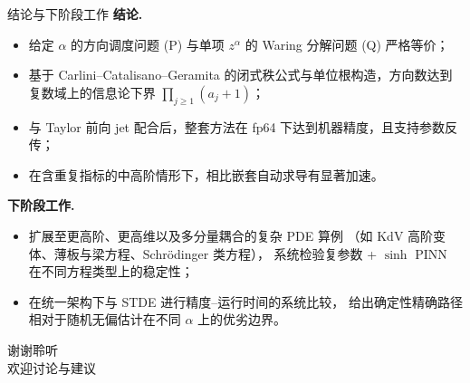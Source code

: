 \documentclass[10pt,aspectratio=169]{beamer}
\begin{document}
\begin{frame}{结论与下阶段工作}
  \textbf{结论.}
  \begin{itemize}
    \item 给定 $\alpha$ 的方向调度问题 (P) 与单项 $z^\alpha$ 的 Waring 分解问题 (Q) 严格等价；
    \item 基于 Carlini--Catalisano--Geramita 的闭式秩公式与单位根构造，方向数达到复数域上的信息论下界 $\prod_{j\ge1}(a_j+1)$；
    \item 与 Taylor 前向 jet 配合后，整套方法在 fp64 下达到机器精度，且支持参数反传；
    \item 在含重复指标的中高阶情形下，相比嵌套自动求导有显著加速。
  \end{itemize}

  \medskip
  \textbf{下阶段工作.}
  \begin{itemize}
    \item 扩展至更高阶、更高维以及多分量耦合的复杂 PDE 算例
        （如 KdV 高阶变体、薄板与梁方程、Schrödinger 类方程），
        系统检验复参数 + $\sinh$ PINN 在不同方程类型上的稳定性；
    \item 在统一架构下与 STDE 进行精度--运行时间的系统比较，
        给出确定性精确路径相对于随机无偏估计在不同 $\alpha$ 上的优劣边界。
  \end{itemize}
\end{frame}

\begin{frame}
  \begin{center}
    \vspace{1.5em}
    {\Large 谢谢聆听}\\[1em]
    \large 欢迎讨论与建议
  \end{center}
\end{frame}
\end{document}
